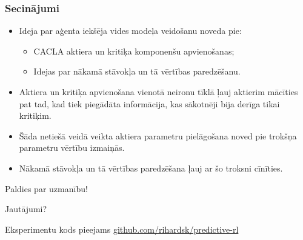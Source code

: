 \documentclass[xetex,mathserif]{beamer}
\begin{document}
  \begin{frame}
    \frametitle{Secinājumi}
      \begin{itemize}
        \item Ideja par aģenta iekšēja vides modeļa veidošanu noveda pie:
          \begin{itemize}
            \item CACLA aktiera un kritiķa komponenšu apvienošanas;
            \item Idejas par nākamā stāvokļa un tā vērtības paredzēšanu.
          \end{itemize}
        \item Aktiera un kritiķa apvienošana vienotā neironu tīklā ļauj aktierim
          mācīties pat tad, kad tiek piegādāta informācija, kas sākotnēji bija
          derīga tikai kritiķim.
        \item Šāda netiešā veidā veikta aktiera parametru pielāgošana noved pie
          trokšņa parametru vērtību izmaiņās.
        \item Nākamā stāvokļa un tā vērtības paredzēšana ļauj ar šo troksni
          cīnīties.
      \end{itemize}
  \end{frame}
  
  \begin{frame}
    \begin{center}
    \huge{Paldies par uzmanību!}

    \vspace{0.5cm}
    \normalsize{Jautājumi?}
    
    \vfill
    \tiny{Eksperimentu kods pieejams
      \href{https://github.com/rihardsk/predictive-rl}{github.com/rihardsk/predictive-rl}}
    \end{center}
  \end{frame}

\end{document}
